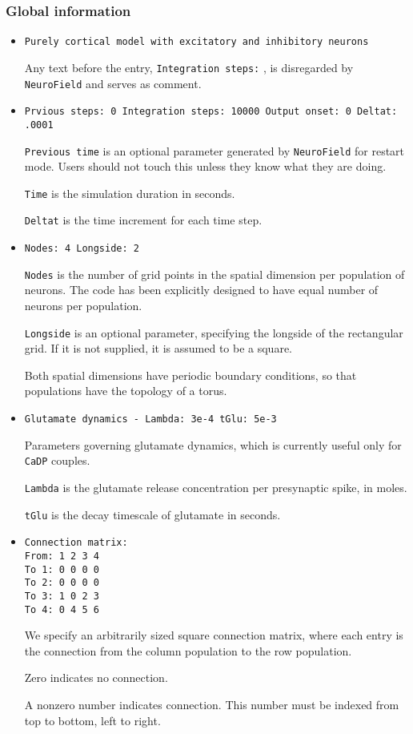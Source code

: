 \documentclass[12pt,a4paper]{article}
\newcommand{\type}[1]{ {\small\small\tt #1} }
\begin{document}
\subsubsection{Global information}
\label{sec:global}
\begin{itemize}

\item
\begin{lstlisting}
Purely cortical model with excitatory and inhibitory neurons
\end{lstlisting}
Any text before the entry, \type{Integration steps:}, is disregarded by \type{NeuroField} and serves as comment.
\item
\begin{lstlisting}
Prvious steps: 0 Integration steps: 10000 Output onset: 0 Deltat: .0001 
\end{lstlisting}
\type{Previous time} is an optional parameter generated by \type{NeuroField} for restart mode. Users should not touch this unless they know what they are doing.

\type{Time} is the simulation duration in seconds.

\type{Deltat} is the time increment for each time step.
\item
\begin{lstlisting}
Nodes: 4 Longside: 2
\end{lstlisting}
\type{Nodes} is the number of grid points in the spatial dimension per population of neurons. The code has been explicitly designed to have equal number of neurons per population.

\type{Longside} is an optional parameter, specifying the longside of the rectangular grid. If it is not supplied, it is assumed to be a square.

Both spatial dimensions have periodic boundary conditions, so that populations have the topology of a torus.
\item
\begin{lstlisting}
Glutamate dynamics - Lambda: 3e-4 tGlu: 5e-3
\end{lstlisting}
Parameters governing glutamate dynamics, which is currently useful only for \type{CaDP} couples.

\type{Lambda} is the glutamate release concentration per presynaptic spike, in moles.

\type{tGlu} is the decay timescale of glutamate in seconds.
\item
\begin{lstlisting}
Connection matrix:
From: 1 2 3 4
To 1: 0 0 0 0
To 2: 0 0 0 0
To 3: 1 0 2 3
To 4: 0 4 5 6
\end{lstlisting}
We specify an arbitrarily sized square connection matrix, where each entry is the connection from the column population to the row population.

Zero indicates no connection.

A nonzero number indicates connection. This number must be indexed from top to bottom, left to right.
\end{itemize}
\end{document}
